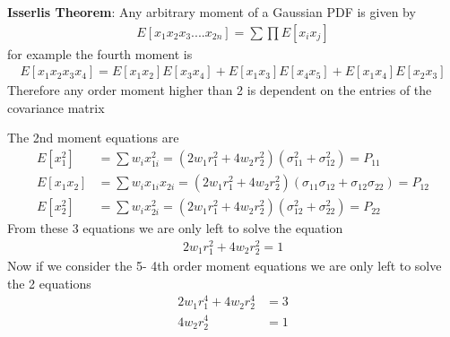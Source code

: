 \documentclass[landscape]{slides}
\begin{document}
\begin{slide}
{\bf Isserlis Theorem}:\newline\newline
 Any arbitrary moment of a Gaussian PDF is given by 
 \begin{align*}
 E[x_1x_2x_3....x_{2n}]=\sum\prod{E[x_ix_j]}
 \end{align*} 
 for example the fourth moment is
 \begin{align*}
 E[x_1x_2x_3x_4]=E[x_1x_2]E[x_3x_4]+E[x_1x_3]E[x_4x_5]+E[x_1x_4]E[x_2x_3]
 \end{align*}
 Therefore any order moment higher than 2 is dependent on the entries of the covariance matrix
    	\end{slide}
\begin{slide}
 The 2nd moment equations are
 \begin{align*} 
E[x_1^2]&=\sum{w_ix_{1i}^2}=(2w_1r_1^2+4w_2r_2^2)(\sigma_{11}^2+\sigma_{12}^2)=P_{11}\\ E[x_1x_2]&=\sum{w_ix_{1i}x_{2i}}=(2w_1r_1^2+4w_2r_2^2)(\sigma_{11}\sigma_{12}+\sigma_{12}\sigma_{22})=P_{12}\\
E[x_2^2]&=\sum{w_ix_{2i}^2}=(2w_1r_1^2+4w_2r_2^2)(\sigma_{12}^2+\sigma_{22}^2)=P_{22}
 \end{align*} 
 From these 3 equations we are only left to solve the equation
 \begin{align*}
 2w_1r_1^2+4w_2r_2^2=1
 \end{align*}
 Now if we consider the 5- 4th order moment equations 
 we are only left to solve the 2 equations
  \begin{align*}
 2w_1r_1^4+4w_2r_2^4&=3\\
 4w_2r_2^4&=1
 \end{align*}
 \end{slide}
\end{document}
